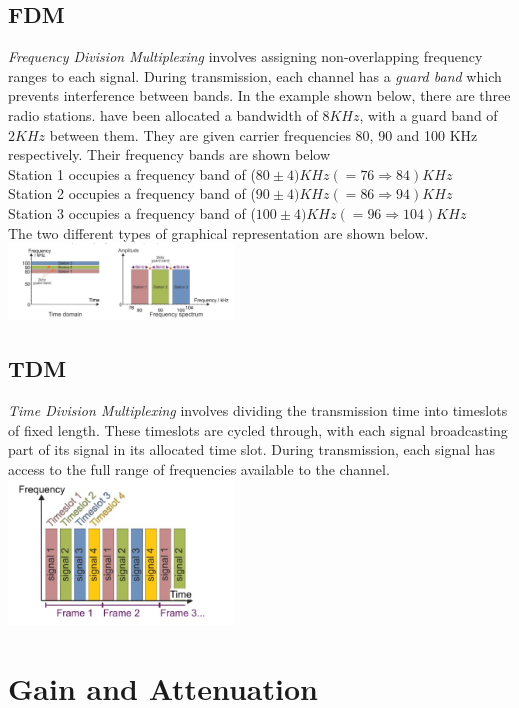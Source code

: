 \documentclass[a4paper,11pt, twocolumn]{article}
\begin{document}
\subsection{FDM}
\textit{Frequency Division Multiplexing} involves assigning non-overlapping frequency ranges to each signal. During transmission, each channel has a \textit{guard band} which prevents interference between bands. In the example shown below, there are three radio stations. have been allocated a bandwidth of $8KHz$, with a guard band of $2KHz$ between them. They are given carrier frequencies 80, 90 and 100 KHz respectively. Their frequency bands are shown below\\
Station 1 occupies a frequency band of ($80 \pm 4) KHz (=76 \Rightarrow 84) KHz$\\
Station 2 occupies a frequency band of ($90 \pm 4) KHz (=86 \Rightarrow 94) KHz$\\
Station 3 occupies a frequency band of ($100 \pm 4) KHz (=96 \Rightarrow 104) KHz$\\
The two different types of graphical representation are shown below.
\includegraphics[width=0.45\textwidth]{fdm.jpg} 
\subsection{TDM}
\textit{Time Division Multiplexing} involves dividing the transmission time into timeslots of fixed length. These timeslots are cycled through, with each signal broadcasting part of its signal in its allocated time slot. During transmission, each signal has access to the full range of frequencies available to the channel.
\includegraphics[width=0.45\textwidth]{tdm.jpg}

\section{Gain and Attenuation}
\end{document}
